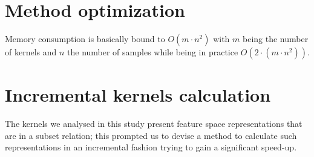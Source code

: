 

\section{Method optimization}
\label{sec:opt}

Memory consumption is basically bound to $O(m\cdot n^2)$ with $m$ being the number of kernels and
$n$ the number of samples while being in practice $O(2\cdot (m\cdot n^2))$.

\section{Incremental kernels calculation} 
\label{sec:inc}
The kernels we analysed in this study present feature space representations
that are in a subset relation; this prompted us to devise a method to calculate
such representations in an incremental fashion trying to gain a significant
speed-up.

